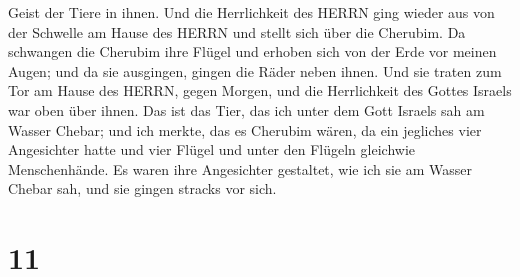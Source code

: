 Geist der Tiere in ihnen.  Und die Herrlichkeit des HERRN
ging wieder aus von der Schwelle am Hause des HERRN und stellt sich über
die Cherubim.  Da schwangen die Cherubim ihre Flügel und
erhoben sich von der Erde vor meinen Augen; und da sie ausgingen, gingen
die Räder neben ihnen. Und sie traten zum Tor am Hause des HERRN, gegen
Morgen, und die Herrlichkeit des Gottes Israels war oben über ihnen.
 Das ist das Tier, das ich unter dem Gott Israels sah am
Wasser Chebar; und ich merkte, das es Cherubim wären,  da
ein jegliches vier Angesichter hatte und vier Flügel und unter den
Flügeln gleichwie Menschenhände.  Es waren ihre Angesichter
gestaltet, wie ich sie am Wasser Chebar sah, und sie gingen stracks vor
sich.

\hypertarget{section-10}{%
\section{11}\label{section-10}}

